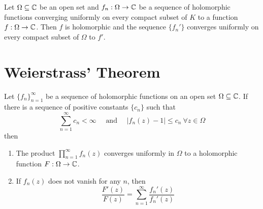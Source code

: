 \begin{lemma}
    Let $\Omega\subseteq\mathbb{C}$ be an open set and $f_n:\Omega\to\mathbb{C}$ be a sequence of holomorphic functions converging uniformly on every compact subset of $K$ to a function $f: \Omega\to\mathbb{C}$. Then $f$ is holomorphic and the sequence $\{f_n'\}$ converges uniformly on every compact subset of $\Omega$ to $f'$.
\end{lemma}

\section{Weierstrass' Theorem}

\begin{theorem}
    Let $\{f_n\}_{n = 1}^\infty$ be a sequence of holomorphic functions on an open set $\Omega\subseteq\mathbb{C}$. If there is a sequence of positive constants $\{c_n\}$ such that 
    \begin{equation*}
        \sum_{n = 1}^{\infty}c_n < \infty\quad\text{ and }\quad|f_n(z) - 1|\le c_n~\forall z\in\Omega
    \end{equation*}
    then 
    \begin{enumerate}[label=(\alph*)]
        \item The product $\displaystyle\prod_{n = 1}^\infty f_n(z)$ converges uniformly in $\Omega$ to a holomorphic function $F: \Omega\to\mathbb{C}$. 
        \item If $f_n(z)$ does not vanish for any $n$, then 
        \begin{equation*}
            \frac{F'(z)}{F(z)} = \sum_{n = 1}^\infty\frac{f_n'(z)}{f_n'(z)}
        \end{equation*}
    \end{enumerate}
\end{theorem}
